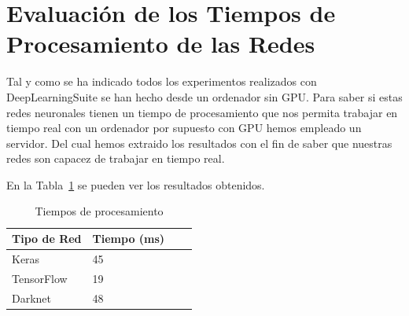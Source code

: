 \section{Evaluación de los Tiempos de Procesamiento de las Redes}

Tal y como se ha indicado todos los experimentos realizados con DeepLearningSuite se han hecho desde un ordenador sin GPU. Para saber si estas redes neuronales tienen un tiempo de procesamiento que nos permita trabajar en tiempo real con un ordenador por supuesto con GPU hemos empleado un servidor. Del cual hemos extraido los resultados con el fin de saber que nuestras redes son capacez de trabajar en tiempo real.

En la Tabla~\ref{tiempos} se pueden ver los resultados obtenidos.

\begin{table}[htbp][H] 
\begin{center}
\begin{tabular}{|l|l|l|l|}
\hline
Tipo de Red & Tiempo (ms)  \\ 
\hline \hline
Keras & 45 \\ \hline
TensorFlow & 19 \\ \hline
Darknet & 48 \\ \hline
\end{tabular}
\caption{Tiempos de procesamiento}
\label{tiempos}
\end{center}
\end{table}




